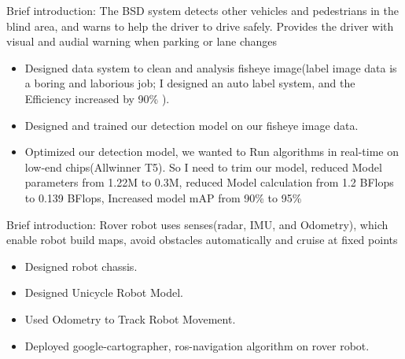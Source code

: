 \documentclass{resume}
\begin{document}

Brief introduction: The BSD system detects other vehicles and pedestrians in the blind area, and warns to help the driver to drive safely. Provides the driver with visual and audial warning when parking or lane changes

\begin{itemize}
  \item Designed data system to clean and analysis fisheye image(label image data is a boring and laborious job; I designed an auto label system, and the Efficiency increased by 90\% ).
  \item Designed and trained our detection model on our fisheye image data.
  \item Optimized our detection model, we wanted to Run algorithms in real-time on low-end chips(Allwinner T5). So I need to trim our model, reduced Model parameters from 1.22M to 0.3M, reduced Model calculation from 1.2 BFlops to 0.139 BFlops, Increased model mAP from 90\% to 95\%
\end{itemize}



Brief introduction: Rover robot uses senses(radar, IMU, and Odometry), which enable robot build maps, avoid obstacles automatically and cruise at fixed points

\begin{itemize}
  \item Designed robot chassis.
  \item Designed Unicycle Robot Model.
  \item Used Odometry to Track Robot Movement.
  \item Deployed google-cartographer, ros-navigation algorithm on rover robot.
\end{itemize}

\end{document}
